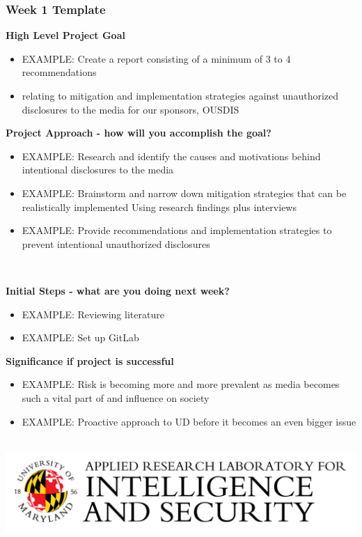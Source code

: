 \documentclass[usenames,dvipsnames]{beamer}
\newcommand\FourQuad[4]{%
    \begin{minipage}[b][.35\textheight][t]{.47\textwidth}#1\end{minipage}\hfill%
    \begin{minipage}[b][.35\textheight][t]{.47\textwidth}#2\end{minipage}\\[0.5em]
    \begin{minipage}[b][.35\textheight][t]{.47\textwidth}#3\end{minipage}\hfill
    \begin{minipage}[b][.35\textheight][t]{.47\textwidth}#4\end{minipage}\\
    \includegraphics[scale=0.05]{Papers/Presentations/Figures/arlis.png}
}
\begin{document}
    \begin{frame}
        \frametitle{\textcolor{Mahogany}{Week 1 Template}}
        \FourQuad%
        {
            \tiny{
                \textbf{High Level Project Goal}  
                \begin{itemize}
                    \item EXAMPLE: Create a report consisting of a minimum of  3 to 4 recommendations
                    \item relating to mitigation and  implementation strategies against unauthorized  disclosures to the media for our sponsors, OUSDIS 
                \end{itemize} 
            }
        }%
        {
            \tiny{
                \textbf{Project Approach - how will you accomplish the goal?} 
                \begin{itemize}
                    \item EXAMPLE: Research and identify the causes and  motivations behind intentional disclosures to the media 
                    \item EXAMPLE: Brainstorm and narrow down mitigation  strategies that can be realistically implemented Using research findings plus interviews 
                    \item EXAMPLE: Provide recommendations and implementation strategies to prevent intentional unauthorized disclosures  
                \end{itemize}
            }
        }%
        {
            \tiny{
                \textbf{Initial Steps - what are you doing next week?}
                \begin{itemize}
                    \item EXAMPLE: Reviewing literature 
                    \item EXAMPLE: Set up GitLab
                \end{itemize}   
            }
        }%
        {
            \tiny{
                \textbf{Significance if project is successful}
                \begin{itemize}
                    \item EXAMPLE: Risk is becoming more and more prevalent as  media becomes such a vital part of and influence on  society  
                    \item EXAMPLE: Proactive approach to UD before it becomes  an even bigger issue 
                \end{itemize} 
            }
        }
    \end{frame}
    
\end{document}
